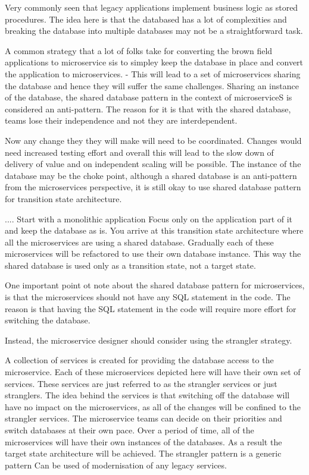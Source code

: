 \documentclass[a4paper, 11pt]{book}
\begin{document}
    Very commonly seen that legacy applications implement business logic as stored procedures.
    The idea here is that the databased has a lot of complexities and breaking the database into multiple databases may not be a straightforward task.

    A common strategy that a lot of folks take for converting the brown field applications to microservice sis to simpley keep the database in place and convert the application to microservices.
    - This will lead to a set of microservices sharing the database and hence they will suffer the same challenges.
    Sharing an instance of the database, the shared database pattern in the context of microserviceS is considered an anti-pattern.
    The reason for it is that with the shared database, teams lose their independence and not they are interdependent.

    Now any change they they will make will need to be coordinated.
    Changes would need increased testing effort and overall this will lead to the slow down of delivery of value and on independent scaling will be possible.
    The instance of the database may be the choke point, although a shared database is an anti-pattern from the microservices perspective, it is still okay to use shared database pattern for transition state architecture.

    ....
    Start with a monolithic application
    Focus only on the application part of it and keep the database as is.
    You arrive at this transition state architecture where all the microservices are using a shared database.
    Gradually each of these microservices will be refactored to use their own database instance.
    This way the shared database is used only as a transition state, not a target state.

    One important point ot note about the shared database pattern for microservices, is that the microservices should not have any SQL statement in the code.
    The reason is that having the SQL statement in the code will require more effort for switching the database.

    Instead, the microservice designer should consider using the strangler strategy.

    A collection of services is created for providing the database access to the microservice.
    Each of these microservices depicted here will have their own set of services.
    These services are just referred to as the strangler services or just stranglers.
    The idea behind the services is that switching off the database will have no impact on the microservices, as all of the changes will be confined to the strangler services.
    The microservice teams can decide on their priorities and switch databases at their own pace.
    Over a period of time, all of the microservices will have their own instances of the databases.
    As a result the target state architecture will be achieved.
    The strangler pattern is a generic pattern
    Can be used of modernisation of any legacy services.
\end{document}
